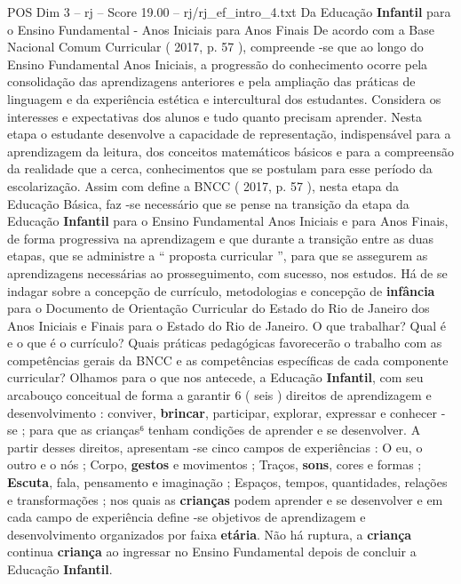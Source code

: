 \begin{textsample}{POS Dim 3 – rj – Score 19.00 – rj/rj\_ef\_intro\_4.txt}  \label{ex:f3_pos_014}
Da Educação \textbf{Infantil} para o Ensino Fundamental - Anos Iniciais para Anos Finais De acordo com a Base Nacional Comum Curricular ( 2017, p. 57 ), compreende -se que ao longo do Ensino Fundamental Anos Iniciais, a progressão do conhecimento ocorre pela consolidação das aprendizagens anteriores e pela ampliação das práticas de linguagem e da experiência estética e intercultural dos estudantes.
Considera os interesses e expectativas dos alunos e tudo quanto precisam aprender.
Nesta etapa o estudante desenvolve a capacidade de representação, indispensável para a aprendizagem da leitura, dos conceitos matemáticos básicos e para a compreensão da realidade que a cerca, conhecimentos que se postulam para esse período da escolarização.
Assim com define a BNCC ( 2017, p. 57 ), nesta etapa da Educação Básica, faz -se necessário que se pense na transição da etapa da Educação \textbf{Infantil} para o Ensino Fundamental Anos Iniciais e para Anos Finais, de forma progressiva na aprendizagem e que durante a transição entre as duas etapas, que se administre a “ proposta curricular ”, para que se assegurem as aprendizagens necessárias ao prosseguimento, com sucesso, nos estudos.
Há de se indagar sobre a concepção de currículo, metodologias e concepção de \textbf{infância} para o Documento de Orientação Curricular do Estado do Rio de Janeiro dos Anos Iniciais e Finais para o Estado do Rio de Janeiro.
O que trabalhar?
Qual é e o que é o currículo?
Quais práticas pedagógicas favorecerão o trabalho com as competências gerais da BNCC e as competências específicas de cada componente curricular?
Olhamos para o que nos antecede, a Educação \textbf{Infantil}, com seu arcabouço conceitual de forma a garantir 6 ( seis ) direitos de aprendizagem e desenvolvimento : conviver, \textbf{brincar}, participar, explorar, expressar e conhecer -se ; para que as crianças⁶ tenham condições de aprender e se desenvolver.
A partir desses direitos, apresentam -se cinco campos de experiências : O eu, o outro e o nós ; Corpo, \textbf{gestos} e movimentos ; Traços, \textbf{sons}, cores e formas ; \textbf{Escuta}, fala, pensamento e imaginação ; Espaços, tempos, quantidades, relações e transformações ; nos quais as \textbf{crianças} podem aprender e se desenvolver e em cada campo de experiência define -se objetivos de aprendizagem e desenvolvimento organizados por faixa \textbf{etária}.
Não há ruptura, a \textbf{criança} continua \textbf{criança} ao ingressar no Ensino Fundamental depois de concluir a Educação \textbf{Infantil}.

\end{textsample}
